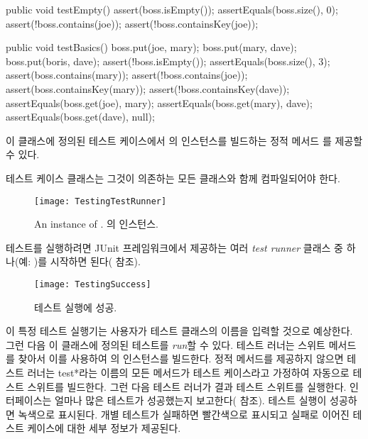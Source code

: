 \documentclass[a4paper,10pt,twoside]{book}
\begin{document}
\begin{code}
	public void testEmpty() {
		assert(boss.isEmpty());
		assertEquals(boss.size(), 0);
		assert(!boss.contains(joe));
		assert(!boss.containsKey(joe));
	}

	public void testBasics() {
		boss.put(joe, mary);
		boss.put(mary, dave);
		boss.put(boris, dave);
		assert(!boss.isEmpty());
		assertEquals(boss.size(), 3);
		assert(boss.contains(mary));
		assert(!boss.contains(joe));
		assert(boss.containsKey(mary));
		assert(!boss.containsKey(dave));
		assertEquals(boss.get(joe), mary);
		assertEquals(boss.get(mary), dave);
		assertEquals(boss.get(dave), null);
	}
\end{code}

이 클래스에 정의된 테스트 케이스에서 의 인스턴스를 빌드하는 정적 메서드 를 제공할 수 있다.

\begin{code}
	public static TestSuite suite() {
		TestSuite suite = new TestSuite();
		suite.addTest(new TestHashtable("testBasics"));
		suite.addTest(new TestHashtable("testEmpty"));
		return suite;
	}
}
\end{code}

테스트 케이스 클래스는 그것이 의존하는 모든 클래스와 함께 컴파일되어야 한다.

\begin{figure}
\begin{center}
\texttt{[image: TestingTestRunner]}
\caption{An instance of .
의 인스턴스.}
\end{center}
\end{figure}

테스트를 실행하려면 JUnit 프레임워크에서 제공하는 여러 \emph{test runner} 클래스 중 하나(예: )를 시작하면 된다( 참조).

\begin{figure}
\begin{center}
\texttt{[image: TestingSuccess]}
\caption{테스트 실행에 성공.}
\end{center}
\end{figure}

이 특정 테스트 실행기는 사용자가 테스트 클래스의 이름을 입력할 것으로 예상한다. 그런 다음 이 클래스에 정의된 테스트를 \emph{run}할 수 있다. 테스트 러너는 스위트 메서드를 찾아서 이를 사용하여 의 인스턴스를 빌드한다. 정적  메서드를 제공하지 않으면 테스트 러너는 test*라는 이름의 모든 메서드가 테스트 케이스라고 가정하여 자동으로 테스트 스위트를 빌드한다. 그런 다음 테스트 러너가 결과 테스트 스위트를 실행한다. 인터페이스는 얼마나 많은 테스트가 성공했는지 보고한다( 참조). 테스트 실행이 성공하면 녹색으로 표시된다. 개별 테스트가 실패하면 빨간색으로 표시되고 실패로 이어진 테스트 케이스에 대한 세부 정보가 제공된다.
\end{document}

